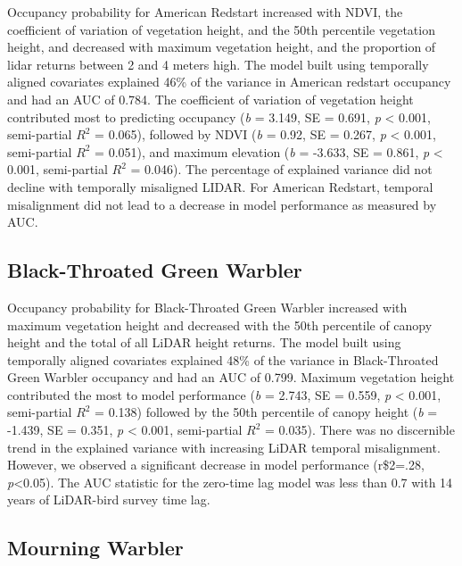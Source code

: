 \documentclass[
]{article}
\begin{document}
Occupancy probability for American Redstart increased with NDVI, the coefficient of variation of vegetation height, and the 50th percentile vegetation height, and decreased with maximum vegetation height, and the proportion of lidar returns between 2 and 4 meters high. The model built using temporally aligned covariates explained 46\% of the variance in American redstart occupancy and had an AUC of 0.784. The coefficient of variation of vegetation height contributed most to predicting occupancy (\emph{b} = 3.149, SE = 0.691, \emph{p} \textless{} 0.001, semi-partial \(R^2\) = 0.065), followed by NDVI (\emph{b} = 0.92, SE = 0.267, \emph{p} \textless{} 0.001, semi-partial \(R^2\) = 0.051), and maximum elevation (\emph{b} = -3.633, SE = 0.861, \emph{p} \textless{} 0.001, semi-partial \(R^2\) = 0.046). The percentage of explained variance did not decline with temporally misaligned LIDAR. For American Redstart, temporal misalignment did not lead to a decrease in model performance as measured by AUC.

\hypertarget{black-throated-green-warbler}{%
\subsection{Black-Throated Green Warbler}\label{black-throated-green-warbler}}

Occupancy probability for Black-Throated Green Warbler increased with maximum vegetation height and decreased with the 50th percentile of canopy height and the total of all LiDAR height returns. The model built using temporally aligned covariates explained 48\% of the variance in Black-Throated Green Warbler occupancy and had an AUC of 0.799. Maximum vegetation height contributed the most to model performance (\emph{b} = 2.743, SE = 0.559, \emph{p} \textless{} 0.001, semi-partial \(R^2\) = 0.138) followed by the 50th percentile of canopy height (\emph{b} = -1.439, SE = 0.351, \emph{p} \textless{} 0.001, semi-partial \(R^2\) = 0.035). There was no discernible trend in the explained variance with increasing LiDAR temporal misalignment. However, we observed a significant decrease in model performance (r\$2=.28, \emph{p}\textless0.05). The AUC statistic for the zero-time lag model was less than 0.7 with 14 years of LiDAR-bird survey time lag.

\hypertarget{mourning-warbler}{%
\subsection{Mourning Warbler}\label{mourning-warbler}}
\end{document}
